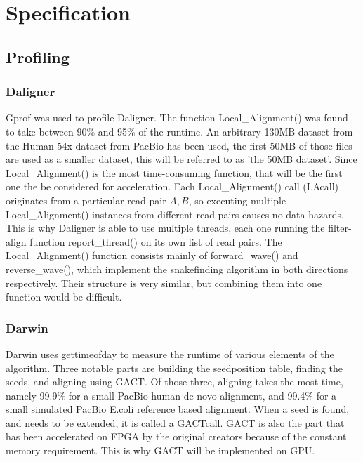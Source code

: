 \documentclass[../thesis.tex]{subfiles}
\begin{document}
\chapter{Specification}
\ifdefined\main
\newcommand{\codePath}{4_specification/code/}
\newcommand{\figPath}{4_specification/figures/}
\else

\fi

\section{Profiling}

\subsection{Daligner}
Gprof \cite{gprof} was used to profile Daligner.
The function Local\_Alignment() was found to take between 90\% and 95\% of the runtime.
An arbitrary 130MB dataset from the Human 54x dataset from PacBio \cite{54x} has been used, the first 50MB of those files are used as a smaller dataset, this will be referred to as 'the 50MB dataset'.
Since Local\_Alignment() is the most time-consuming function, that will be the first one the be considered for acceleration.
Each Local\_Alignment() call (LAcall) originates from a particular read pair $A, B$, so executing multiple Local\_Alignment() instances from different read pairs causes no data hazards.
This is why Daligner is able to use multiple threads, each one running the filter-align function report\_thread() on its own list of read pairs.
The Local\_Alignment() function consists mainly of forward\_wave() and reverse\_wave(), which implement the snakefinding algorithm in both directions respectively.
Their structure is very similar, but combining them into one function would be difficult.

\subsection{Darwin}
Darwin uses gettimeofday \cite{gettimeofday} to measure the runtime of various elements of the algorithm.
Three notable parts are building the seedposition table, finding the seeds, and aligning using GACT.
Of those three, aligning takes the most time, namely 99.9\% for a small PacBio human de novo alignment, and 99.4\% for a small simulated PacBio E.coli reference based alignment.
When a seed is found, and needs to be extended, it is called a GACTcall.
GACT is also the part that has been accelerated on FPGA by the original creators because of the constant memory requirement.
This is why GACT will be implemented on GPU.
\end{document}
